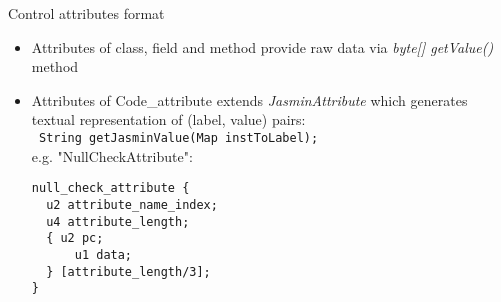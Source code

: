 \begin{slide}{Control attributes format}
\begin{itemize}
\item Attributes of class, field and method provide raw data 
      via {\em byte[] getValue()} method
\item Attributes of Code\_attribute extends {\em JasminAttribute}
      which generates textual representation of (label, value)
      pairs:\\
\footnotesize{\verb$ String getJasminValue(Map instToLabel); $} \\
e.g. "NullCheckAttribute":
\footnotesize{
\begin{verbatim}
null_check_attribute {
  u2 attribute_name_index;
  u4 attribute_length;
  { u2 pc;
      u1 data;
  } [attribute_length/3];
}
\end{verbatim}
}
\end{itemize}
\end{slide}
